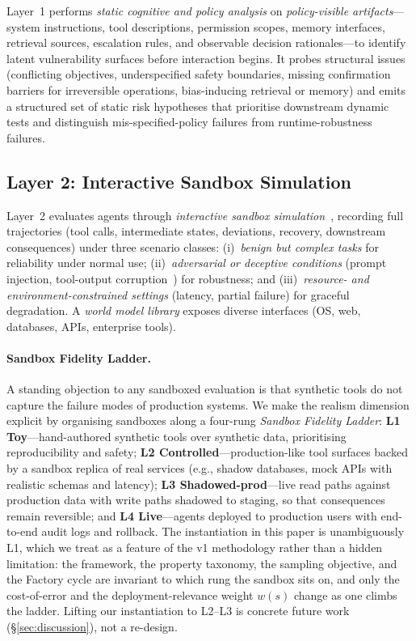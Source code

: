 Layer~1 performs \emph{static cognitive and policy analysis} on \emph{policy-visible artifacts}---system instructions, tool descriptions, permission scopes, memory interfaces, retrieval sources, escalation rules, and observable decision rationales---to identify latent vulnerability surfaces before interaction begins. It probes structural issues (conflicting objectives, underspecified safety boundaries, missing confirmation barriers for irreversible operations, bias-inducing retrieval or memory) and emits a structured set of static risk hypotheses that prioritise downstream dynamic tests and distinguish mis-specified-policy failures from runtime-robustness failures.

\subsection{Layer 2: Interactive Sandbox Simulation}
\label{subsec:layer2}

Layer~2 evaluates agents through \emph{interactive sandbox simulation}~\cite{yao2024taubench,lu2024toolsandbox}, recording full trajectories (tool calls, intermediate states, deviations, recovery, downstream consequences) under three scenario classes: (i)~\emph{benign but complex tasks} for reliability under normal use; (ii)~\emph{adversarial or deceptive conditions} (prompt injection, tool-output corruption~\cite{debenedetti2024agentdojo,liu2023promptinj}) for robustness; and (iii)~\emph{resource- and environment-constrained settings} (latency, partial failure) for graceful degradation. A \emph{world model library} exposes diverse interfaces (OS, web, databases, APIs, enterprise tools).

\paragraph{Sandbox Fidelity Ladder.}
A standing objection to any sandboxed evaluation is that synthetic tools do not capture the failure modes of production systems. We make the realism dimension explicit by organising sandboxes along a four-rung \emph{Sandbox Fidelity Ladder}: \textbf{L1 Toy}---hand-authored synthetic tools over synthetic data, prioritising reproducibility and safety; \textbf{L2 Controlled}---production-like tool surfaces backed by a sandbox replica of real services (e.g., shadow databases, mock APIs with realistic schemas and latency); \textbf{L3 Shadowed-prod}---live read paths against production data with write paths shadowed to staging, so that consequences remain reversible; and \textbf{L4 Live}---agents deployed to production users with end-to-end audit logs and rollback. The instantiation in this paper is unambiguously L1, which we treat as a feature of the v1 methodology rather than a hidden limitation: the framework, the property taxonomy, the sampling objective, and the Factory cycle are invariant to which rung the sandbox sits on, and only the cost-of-error and the deployment-relevance weight $w(s)$ change as one climbs the ladder. Lifting our instantiation to L2--L3 is concrete future work (\S\ref{sec:discussion}), not a re-design.

